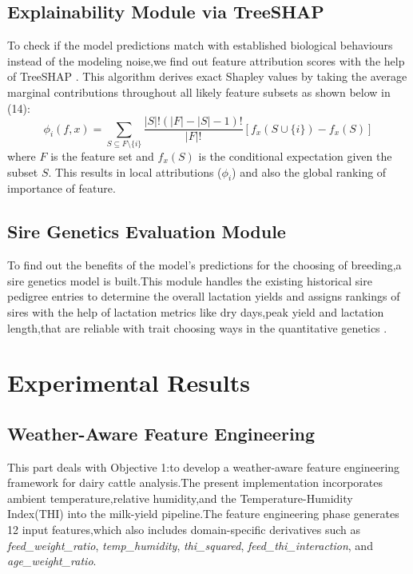 \documentclass[conference]{IEEEtran}
\begin{document}
	\subsection{Explainability Module via TreeSHAP}
	To check if the model predictions match with established biological behaviours instead of the modeling noise,we find out feature attribution scores with the help of TreeSHAP \cite{ref3}. This algorithm derives exact Shapley values by taking the average marginal contributions throughout all likely feature subsets as shown below in (14):
	\begin{equation}
		\phi_i(f, x) = \sum_{S \subseteq F \setminus \{i\}} \frac{|S|!(|F| - |S| - 1)!}{|F|!} \left[f_x(S \cup \{i\}) - f_x(S)\right]
		\tag{15}
	\end{equation}
	where $F$ is the feature set and $f_x(S)$ is the conditional expectation given the subset $S$. This results in local attributions ($\phi_i$) and also the global ranking of importance of feature.
	
	\subsection{Sire Genetics Evaluation Module}
	To find out the benefits of the model's predictions for the choosing of breeding,a sire genetics model is built.This module handles the existing historical sire pedigree entries to determine the overall lactation yields and assigns rankings of sires with the help of lactation metrics like dry days,peak yield and lactation length,that are reliable with trait choosing ways in the quantitative genetics \cite{ref8}.
	
	\section{Experimental Results}
	
	\subsection{Weather-Aware Feature Engineering}
	This part deals with Objective 1:to develop a weather-aware feature engineering framework for dairy cattle analysis.The present implementation incorporates ambient temperature,relative humidity,and the Temperature-Humidity Index(THI) into the milk-yield pipeline.The feature engineering phase generates 12 input features,which also includes domain-specific derivatives such as \textit{feed\_weight\_ratio}, \textit{temp\_humidity}, \textit{thi\_squared}, \textit{feed\_thi\_interaction}, and \textit{age\_weight\_ratio}.
	
\end{document}
